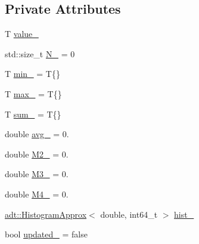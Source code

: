\subsection*{Private Attributes}
\begin{DoxyCompactItemize}
\item 
T \hyperlink{structvt_1_1runtime_1_1component_1_1detail_1_1_diagnostic_value_wrapper_a0c675d645decffc3484ce8ab75a18f8b}{value\+\_\+}
\item 
std\+::size\+\_\+t \hyperlink{structvt_1_1runtime_1_1component_1_1detail_1_1_diagnostic_value_wrapper_a8055733259d06927a4c3e02e0d1649e4}{N\+\_\+} = 0
\item 
T \hyperlink{structvt_1_1runtime_1_1component_1_1detail_1_1_diagnostic_value_wrapper_ab68e4198cf0512a06af2e75d0a4837a4}{min\+\_\+} = T\{\}
\item 
T \hyperlink{structvt_1_1runtime_1_1component_1_1detail_1_1_diagnostic_value_wrapper_a2db654ff7822440abfe2ef0b1dd1958a}{max\+\_\+} = T\{\}
\item 
T \hyperlink{structvt_1_1runtime_1_1component_1_1detail_1_1_diagnostic_value_wrapper_afc3afcf348de09544bf109097224b7eb}{sum\+\_\+} = T\{\}
\item 
double \hyperlink{structvt_1_1runtime_1_1component_1_1detail_1_1_diagnostic_value_wrapper_af43c732f760bdc64bb3d893e3aa900b6}{avg\+\_\+} = 0.
\item 
double \hyperlink{structvt_1_1runtime_1_1component_1_1detail_1_1_diagnostic_value_wrapper_af76d6679a75ff42618eabd6ae844e18e}{M2\+\_\+} = 0.
\item 
double \hyperlink{structvt_1_1runtime_1_1component_1_1detail_1_1_diagnostic_value_wrapper_a53e9c5563eb7a716f755536de3cc410d}{M3\+\_\+} = 0.
\item 
double \hyperlink{structvt_1_1runtime_1_1component_1_1detail_1_1_diagnostic_value_wrapper_af7e886c6de25a8dfe72eb607bcd61d11}{M4\+\_\+} = 0.
\item 
\hyperlink{namespacevt_1_1adt_a486971e142bc22434d6afe695c43b599}{adt\+::\+Histogram\+Approx}$<$ double, int64\+\_\+t $>$ \hyperlink{structvt_1_1runtime_1_1component_1_1detail_1_1_diagnostic_value_wrapper_af507930d714b3665233a19ef93fc6d32}{hist\+\_\+}
\item 
bool \hyperlink{structvt_1_1runtime_1_1component_1_1detail_1_1_diagnostic_value_wrapper_a4b844fd84acb8f1e1f9b2055f2f7b8bf}{updated\+\_\+} = false
\end{DoxyCompactItemize}
